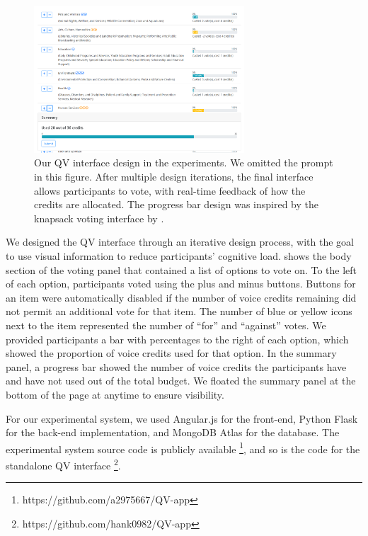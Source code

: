 \begin{figure}[htpb]
    \centering
    \includegraphics[width=0.7\textwidth, keepaspectratio=true]{content/image/qv-donation.png}
    \caption{
        Our QV interface design in the experiments. 
        We omitted the prompt in this figure.
        After multiple design iterations, 
        the final interface allows participants to vote, with real-time feedback of how the credits are allocated. 
        The progress bar design was inspired by the knapsack voting interface by \cite{goel2015knapsack}.
    }
    \label{fig:qv_donation}
\end{figure}

We designed the QV interface through an iterative design process, with the goal to use visual information to reduce participants' cognitive load.  shows the body section of the voting panel that contained a list of options to vote on. To the left of each option, participants voted using the plus and minus buttons. Buttons for an item were automatically disabled if the number of voice credits remaining did not permit an additional vote for that item. The number of blue or yellow icons next to the item represented the number of ``for'' and ``against'' votes. We provided participants a bar with percentages to the right of each option, which showed the proportion of voice credits used for that option.  In the summary panel, a progress bar showed the number of voice credits the participants have and have not used out of the total budget. We floated the summary panel at the bottom of the page at anytime to ensure visibility.

For our experimental system, we used Angular.js for the front-end, Python Flask for the back-end implementation, and MongoDB Atlas for the database. The experimental system source code is publicly available \footnote{https://github.com/a2975667/QV-app}, and so is the code for the standalone QV interface \footnote{https://github.com/hank0982/QV-app}. 


